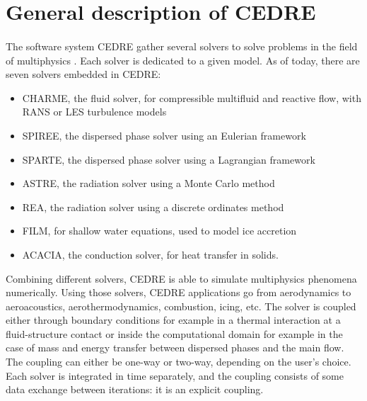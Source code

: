   \section{General description of CEDRE}

    \paragraph{}
    The software system CEDRE gather several solvers to solve problems in the field of multiphysics \cite{ReflochCourbetMurroneEtAl2011}.
    Each solver is dedicated to a given model.
    As of today, there are seven solvers embedded in CEDRE:
    \begin{itemize}
      \item CHARME, the fluid solver, for compressible multifluid and reactive flow, with RANS or LES turbulence models
      \item SPIREE, the dispersed phase solver using an Eulerian framework
      \item SPARTE, the dispersed phase solver using a Lagrangian framework
      \item ASTRE, the radiation solver using a Monte Carlo method
      \item REA, the radiation solver using a discrete ordinates method
      \item FILM, for shallow water equations, used to model ice accretion
      \item ACACIA, the conduction solver, for heat transfer in solids.
    \end{itemize}
    Combining different solvers, CEDRE is able to simulate multiphysics phenomena numerically.
    Using those solvers, CEDRE applications go from aerodynamics to aeroacoustics, aerothermodynamics, combustion, icing, etc.
    The solver is coupled either through boundary conditions for example in a thermal interaction at a fluid-structure contact or inside the computational domain for example in the case of mass and energy transfer between dispersed phases and the main flow.
    The coupling can either be one-way or two-way, depending on the user's choice.
    Each solver is integrated in time separately, and the coupling consists of some data exchange between iterations: it is an explicit coupling.

